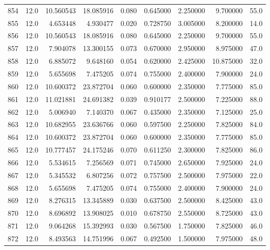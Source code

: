 \begin{tabular}{lrrrrrrrr}
854  &   12.0 &  10.560543 &  18.085916 &  0.080 &  0.645000 &  2.250000 &   9.700000 &   55.0 \\
855  &   12.0 &   4.653448 &   4.930477 &  0.020 &  0.728750 &  3.005000 &   8.200000 &   14.0 \\
856  &   12.0 &  10.560543 &  18.085916 &  0.080 &  0.645000 &  2.250000 &   9.700000 &   55.0 \\
857  &   12.0 &   7.904078 &  13.300155 &  0.073 &  0.670000 &  2.950000 &   8.975000 &   47.0 \\
858  &   12.0 &   6.885072 &   9.648160 &  0.054 &  0.620000 &  2.425000 &  10.875000 &   32.0 \\
859  &   12.0 &   5.655698 &   7.475205 &  0.074 &  0.755000 &  2.400000 &   7.900000 &   24.0 \\
860  &   12.0 &  10.600372 &  23.872704 &  0.060 &  0.600000 &  2.350000 &   7.775000 &   85.0 \\
861  &   12.0 &  11.021881 &  24.691382 &  0.039 &  0.910177 &  2.500000 &   7.225000 &   88.0 \\
862  &   12.0 &   5.006940 &   7.140370 &  0.067 &  0.435000 &  2.350000 &   7.125000 &   25.0 \\
863  &   12.0 &  10.682955 &  23.636766 &  0.060 &  0.597500 &  2.250000 &   7.825000 &   84.0 \\
864  &   12.0 &  10.600372 &  23.872704 &  0.060 &  0.600000 &  2.350000 &   7.775000 &   85.0 \\
865  &   12.0 &  10.777457 &  24.175246 &  0.070 &  0.611250 &  2.300000 &   7.825000 &   86.0 \\
866  &   12.0 &   5.534615 &   7.256569 &  0.071 &  0.745000 &  2.650000 &   7.925000 &   24.0 \\
867  &   12.0 &   5.345532 &   6.807256 &  0.072 &  0.757500 &  2.500000 &   7.975000 &   22.0 \\
868  &   12.0 &   5.655698 &   7.475205 &  0.074 &  0.755000 &  2.400000 &   7.900000 &   24.0 \\
869  &   12.0 &   8.276315 &  13.345889 &  0.030 &  0.637500 &  2.500000 &   8.425000 &   43.0 \\
870  &   12.0 &   8.696892 &  13.908025 &  0.010 &  0.678750 &  2.550000 &   8.725000 &   43.0 \\
871  &   12.0 &   9.064268 &  15.392993 &  0.030 &  0.567500 &  1.750000 &   7.825000 &   46.0 \\
872  &   12.0 &   8.493563 &  14.751996 &  0.067 &  0.492500 &  1.500000 &   7.975000 &   48.0 \\

\end{tabular}
